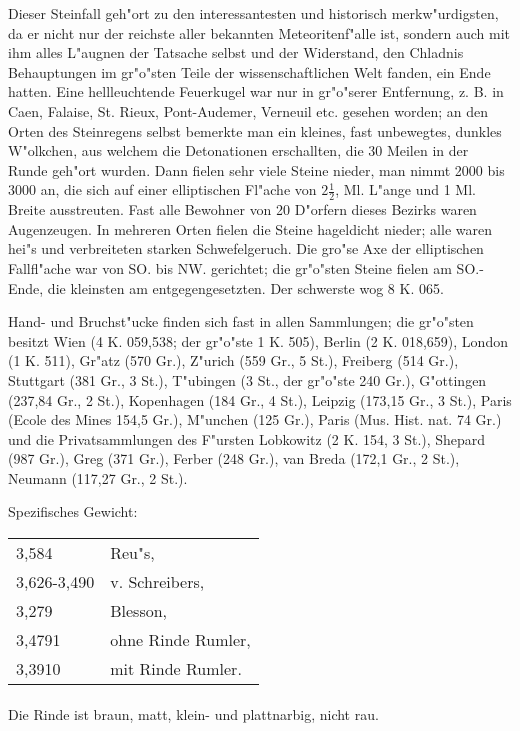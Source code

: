 \documentclass[a4paper, 11pt, oneside]{article}
\begin{document}
Dieser Steinfall geh"ort zu den interessantesten und historisch merkw"urdigsten, da er nicht nur der reichste aller bekannten Meteoritenf"alle ist, sondern auch mit ihm alles L"augnen der Tatsache selbst und der Widerstand, den Chladnis Behauptungen im gr"o"sten Teile der wissenschaftlichen Welt fanden, ein Ende hatten. Eine hellleuchtende Feuerkugel war nur in gr"o"serer Entfernung, z. B. in Caen, Falaise, St. Rieux, Pont-Audemer, Verneuil etc. gesehen worden; an den Orten des Steinregens selbst bemerkte man ein kleines, fast unbewegtes, dunkles W"olkchen, aus welchem die Detonationen erschallten, die 30 Meilen in der Runde geh"ort wurden. Dann fielen sehr viele Steine nieder, man nimmt 2000 bis 3000 an, die sich auf einer elliptischen Fl"ache von $2\frac{1}{2}$, Ml. L"ange und 1 Ml. Breite ausstreuten. Fast alle Bewohner von 20 D"orfern dieses Bezirks waren Augenzeugen. In mehreren Orten fielen die Steine hageldicht nieder; alle waren hei"s und verbreiteten starken Schwefelgeruch. Die gro"se Axe der elliptischen Fallfl"ache war von SO. bis NW. gerichtet; die gr"o"sten Steine fielen am SO.-Ende, die kleinsten am entgegengesetzten. Der schwerste wog 8 K. 065.

Hand- und Bruchst"ucke finden sich fast in allen Sammlungen; die gr"o"sten besitzt Wien (4 K. 059,538; der gr"o"ste 1 K. 505), Berlin (2 K. 018,659), London (1 K. 511), Gr"atz (570 Gr.), Z"urich (559 Gr., 5 St.), Freiberg (514 Gr.), Stuttgart (381 Gr., 3 St.), T"ubingen (3 St., der gr"o"ste 240 Gr.), G"ottingen (237,84 Gr., 2 St.), Kopenhagen (184 Gr., 4 St.), Leipzig (173,15 Gr., 3 St.), Paris (Ecole des Mines 154,5 Gr.), M"unchen (125 Gr.), Paris (Mus. Hist. nat. 74 Gr.) und die Privatsammlungen des F"ursten Lobkowitz (2 K. 154, 3 St.), Shepard (987 Gr.), Greg (371 Gr.), Ferber (248 Gr.), van Breda (172,1 Gr., 2 St.), Neumann (117,27 Gr., 2 St.).

Spezifisches Gewicht:
\begin{table}[!ht]
    \centering
    \begin{tabular}{l l}
        3,584 & Reu"s,\\
        3,626-3,490 & v. Schreibers,\\
        3,279 & Blesson,\\
        3,4791 & ohne Rinde Rumler,\\
        3,3910 & mit Rinde Rumler.
    \end{tabular}
\end{table}
\paragraph{}
Die Rinde ist braun, matt, klein- und plattnarbig, nicht rau.
\end{document}
